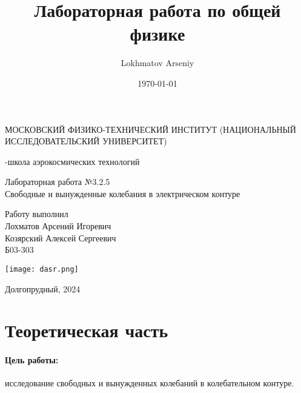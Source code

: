 \documentclass[a4paper,12pt]{article} %
\author{Lokhmatov Arseniy}
\title{Лабораторная работа по общей физике}
\date{\today}
\begin{document}
\begin{titlepage}
    \newpage
    \begin{center}
    {\large МОСКОВСКИЙ ФИЗИКО-ТЕХНИЧЕСКИЙ ИНСТИТУТ (НАЦИОНАЛЬНЫЙ ИССЛЕДОВАТЕЛЬСКИЙ УНИВЕРСИТЕТ)}
    \vspace{1cm}

    {-школа аэрокосмических технологий}
    \vspace{6em}
    \end{center}
    
    \vspace{1.2em}

    \begin{center}
    \Large Лабораторная работа №3.2.5 \\
    Свободные и вынужденные колебания в электрическом контуре
    \linebreak
    \end{center}
    
    \vspace{11em}
    
    \begin{flushright}
                       {\large Работу выполнил\\
                       Лохматов Арсений Игоревич\\
                       Козярский Алексей Сергеевич\\
                       Б03-303 }
    \end{flushright}

    \vspace{\fill}

    \begin{center}
        \texttt{[image: dasr.png]}
    \end{center}

    \begin{center}
    Долгопрудный, 2024
    \end{center}

    \end{titlepage}

\section{Теоретическая часть}

\paragraph{Цель работы:} исследование свободных и вынужденных колебаний в колебательном контуре.
\end{document}
